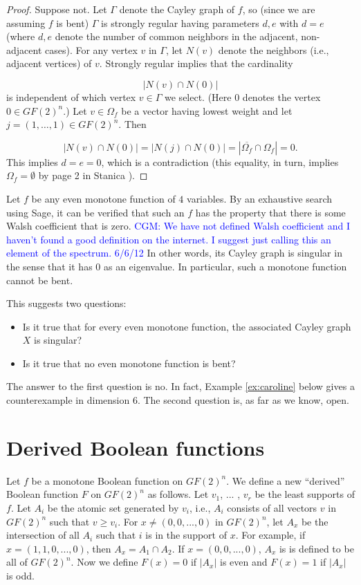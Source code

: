 \documentclass[12pt]{article}
\def\blue#1{\textcolor{blue}{#1}}
\newcommand{\cgm}[1]{\blue{CGM: #1}}
\begin{document}
\begin{proof}
Suppose not. Let $\Gamma$ denote the Cayley graph of $f$, so
(since we are assuming $f$ is bent) $\Gamma$ is strongly regular
having parameters $d,e$ with $d=e$ (where $d,e$ denote the number
of common neighbors in the adjacent, non-adjacent cases).
For any vertex $v$ in $\Gamma$, let $N(v)$ denote the neighbors
(i.e., adjacent vertices) of $v$. Strongly regular implies that the cardinality

\[
|N(v)\cap N(0)|
\]
is independent of which vertex $v \in \Gamma$ we select.
(Here $0$ denotes the vertex $0\in GF(2)^n$.)
Let $v\in \Omega_f$ be a vector having lowest weight
and let $j=(1,\dots,1)\in GF(2)^n$.
Then

\[
|N(v)\cap N(0)| = |N(j)\cap N(0)| = |\overline{\Omega_f}\cap \Omega_f|=0.
\]
This implies $d=e=0$, which is a contradiction (this equality, in turn, implies
$\Omega_f=\emptyset$ by page 2 in Stanica \cite{art:s07}).
\end{proof}

Let $f$ be any even monotone function of $4$ variables. By an
exhaustive search using Sage, it can be verified that such an $f$ has
the property that there is some Walsh coefficient that is zero.
\cgm{We have not defined Walsh coefficient and I haven't found a 
good definition on the internet.  I suggest just calling this an element of 
the spectrum. 6/6/12}
In other words, its Cayley graph is singular in the sense that it
has $0$ as an eigenvalue. In particular, such a monotone function
cannot be bent.

This suggests two questions:
\begin{itemize}
\item
Is it true that for every even monotone function, the associated
Cayley graph $X$ is singular?
\item
Is it true that no even monotone function is bent?
\end{itemize}
The answer to the first question is no. In fact, Example \ref{ex:caroline}
below gives a counterexample in dimension $6$.
The second question is, as far as we know, open.


\section{Derived Boolean functions}

Let $f$ be a monotone Boolean function on $GF(2)^n$.    We define a new ``derived'' Boolean function $F$ on $GF(2)^n$ as follows.
Let $v_1$, ... , $v_r$ be the least supports of $f$.  Let $A_i$ be the atomic set generated by $v_i$, i.e., $A_i$ consists of all vectors $v$ in
$GF(2)^n$ such that $v \geq v_i$.  For $x \neq (0,0,...,0)$ in $GF(2)^n$, let $A_x$ be the intersection of all $A_i$ such that $i$ is in the support of $x$.
For example, if $x=(1,1,0,...,0)$, then $A_x=A_1 \cap A_2$.  If $x=(0,0,...,0)$, $A_x$ is is defined to be all of $GF(2)^n$.
Now we define $F(x)=0$ if $|A_x|$ is even and $F(x)=1$ if $|A_x|$ is odd.
\end{document}
